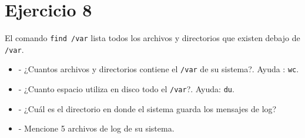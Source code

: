 \documentclass[12pt]{article}
\begin{document}
\section*{Ejercicio 8}
El comando \texttt{find /var} lista todos los archivos y directorios que existen debajo de \texttt{/var}.
\begin{itemize}
\item - ¿Cuantos archivos y directorios contiene el \texttt{/var} de su sistema?. Ayuda : \texttt{wc}.
\item - ¿Cuanto espacio utiliza en disco todo el \texttt{/var}?. Ayuda: \texttt{du}.
\item - ¿Cuál es el directorio en donde el sistema guarda los mensajes de log?
\item - Mencione 5 archivos de log de su sistema.
\end{itemize}
\end{document}
